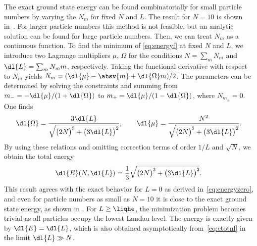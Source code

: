 \noindent
The exact ground state energy can be found combinatorially for small particle numbers by varying the $N_m$ for fixed $N$ and $L$. The result for $N=10$ is shown in~. For larger particle numbers this method is not feasible, but an analytic solution can be found for large particle numbers. Then, we can treat $N_{m}$ as a continuous function. To find the minimum of \eqref{eq:energyf} at fixed $N$ and $L$, we introduce two Lagrange multipliers $\mu$, $\Omega$ for the conditions $N = \sum_m N_m$ and $\dl{L} = \sum_m N_m m$, respectively. Taking the functional derivative with respect to $N_m$ yields
$N_m=(\dl{\mu}-\absv{m}+\dl{\Omega} m)/2$.
The parameters can be determined by solving the constraints and summing from $m_-=-\dl{\mu}/(1+\dl{\Omega})$ to $m_+=\dl{\mu}/(1-\dl{\Omega})$, where $N_{m_\pm}=0$. One finds
\begin{align*}
\dl{\Omega} = \frac{3 \dl{L}}{\sqrt{\big(2N\big)^3 + \big(3\dl{L}\big)^2}}, \qquad \dl{\mu}= \frac{N^2}{\sqrt{\big(2N\big)^3 + \big(3\dl{L}\big)^2}}.
\end{align*}
By using these relations and omitting correction terms of order $1/L$ and $\sqrt{N}$, we obtain the total energy
\begin{align} \label{eq:etotnl}
\dl{E}(N,\dl{L})= \frac{1}{3} \sqrt{\big(2N\big)^3 + \big(3\dl{L}\big)^2}.
\end{align}
This result agrees with the exact behavior for $L=0$ as derived in~\eqref{eq:energyzero}, and even for particle numbers as small as $N=10$ it is close to the exact ground state energy, as shown in . For $L\ge\liqhe$, the minimization problem becomes trivial as all particles occupy the lowest Landau level. The energy is exactly given by $\dl{E}=\dl{L}$, which is also obtained asymptotically from~\eqref{eq:etotnl} in the limit $\dl{L}\gg N$.

